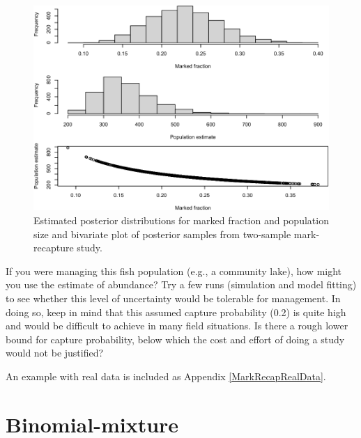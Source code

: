 \documentclass[
]{krantz}
\begin{document}
\begin{figure}
\includegraphics[width=0.9\linewidth]{bookdown_files/figure-latex/PopEst-covary-1} \caption{Estimated posterior distributions for marked fraction and population size and bivariate plot of posterior samples from two-sample mark-recapture study.}\label{fig:PopEst-covary}
\end{figure}

If you were managing this fish population (e.g., a community lake), how might you use the estimate of abundance? Try a few runs (simulation and model fitting) to see whether this level of uncertainty would be tolerable for management. In doing so, keep in mind that this assumed capture probability (0.2) is quite high and would be difficult to achieve in many field situations. Is there a rough lower bound for capture probability, below which the cost and effort of doing a study would not be justified?

An example with real data is included as Appendix \ref{MarkRecapRealData}.

\hypertarget{NMix}{%
\section{Binomial-mixture}\label{NMix}}
\end{document}
